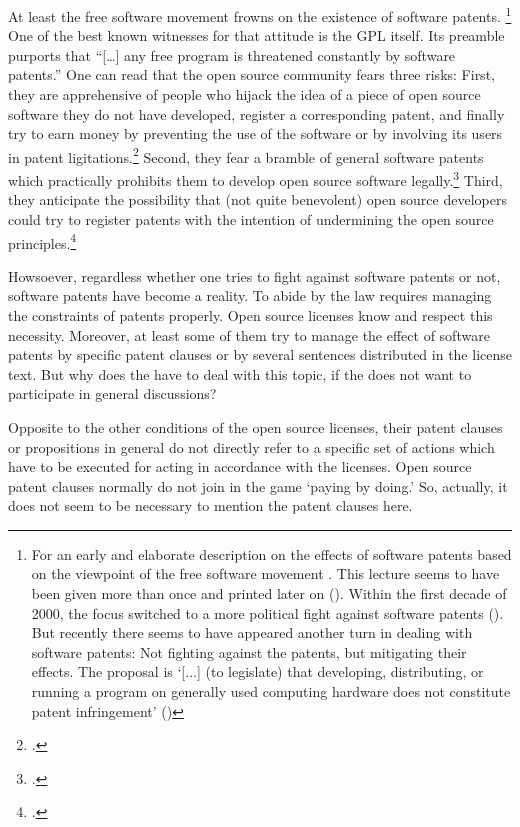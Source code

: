 At least the free software movement frowns on the existence of software
patents.%
  \footnote{For an early and elaborate description on the effects of
  software patents based on the viewpoint of the free software movement
  \cite[see][\nopage wp]{Stallman2001a}. This lecture seems to have been given
  more than once and printed later on (\cite[cf.][\nopage wp]{Stallman2002a}).
  Within the first decade of 2000, the focus switched to a more political fight
  against software patents (\cite[cf.][\nopage wp]{Stallman2004a}). But recently
  there seems to have appeared another turn in dealing with software patents:
  Not fighting against the patents, but mitigating their effects. The proposal is
  `[...] (to legislate) that developing, distributing, or running a program on
  generally used computing hardware does not constitute patent infringement'
  (\cite[cf.][\nopage wp]{Stallman2012a})}
One of the best known witnesses for that attitude is the GPL itself. Its
preamble purports that \enquote{[\ldots] any free program is threatened
constantly by software patents.}\citeGPLtwo{} One can read that the open
source community fears three risks: First, they are apprehensive of people who
hijack the idea of a piece of open source software they do not have developed,
register a corresponding patent, and finally try to earn money by preventing the
use of the software or by involving its users in patent
ligitations.\footcite[cf.][234]{JaeMet2011a} Second, they fear a bramble of
general software patents which practically prohibits them to develop open source
software legally.\footcite[cf.][234]{JaeMet2011a} Third, they anticipate the
possibility that (not quite benevolent) open source developers could try to
register patents with the intention of undermining the open source
principles.\footcite[cf.][235]{JaeMet2011a}

Howsoever, regardless whether one tries to fight against software patents or not,
software patents have become a reality. To abide by the law requires managing the
constraints of patents properly. Open source licenses know and respect this
necessity. Moreover, at least some of them try to manage the effect of software
patents by specific patent clauses or by several
sentences distributed in the license text. But why
does the \oslic{} have to deal with this topic, if the \oslic{} does not want to
participate in general discussions?

Opposite to the other conditions of the open source licenses, their patent
clauses or propositions in general do not directly refer to a specific set of
actions which have to be executed for acting in accordance with the licenses. Open
source patent clauses normally do not join in the game `paying by doing.' So,
actually, it does not seem to be necessary to mention the patent clauses here.

